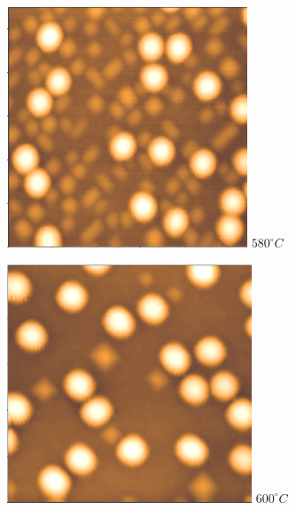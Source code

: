 \documentclass[10pt,pdf,hyperref={unicode}, dvipsnames]{beamer}
\begin{document}
\begin{frame}[t]
	\begin{minipage}{0.32\linewidth}	
		\centering
		\includegraphics[width = \linewidth]{imgs/exp/580.png}
		$580^{\circ}C$	
	\end{minipage}	
	\begin{minipage}{0.32\linewidth}	
		\centering
		\includegraphics[width = \linewidth]{imgs/exp/600.png}
		$600^{\circ}C$	

	\end{minipage}

\end{frame}
\end{document}
